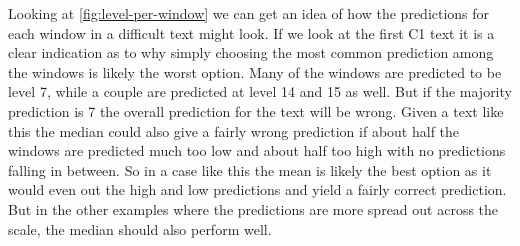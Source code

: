 \documentclass[11pt,a4paper]{article}
\begin{document}
Looking at \autoref{fig:level-per-window} we can get an idea of how the
predictions for each window in a difficult text might look. If we look at the
first C1 text it is a clear indication as to why simply choosing the most
common prediction among the windows is likely the worst option. Many of the
windows are predicted to be level 7, while a couple are predicted at level 14
and 15 as well. But if the majority prediction is 7 the overall prediction for
the text will be wrong. Given a text like this the median could also give a
fairly wrong prediction if about half the windows are predicted much too low
and about half too high with no predictions falling in between. So in a case
like this the mean is likely the best option as it would even out the high and
low predictions and yield a fairly correct prediction. But in the other
examples where the predictions are more spread out across the scale, the median
should also perform well.
\end{document}
